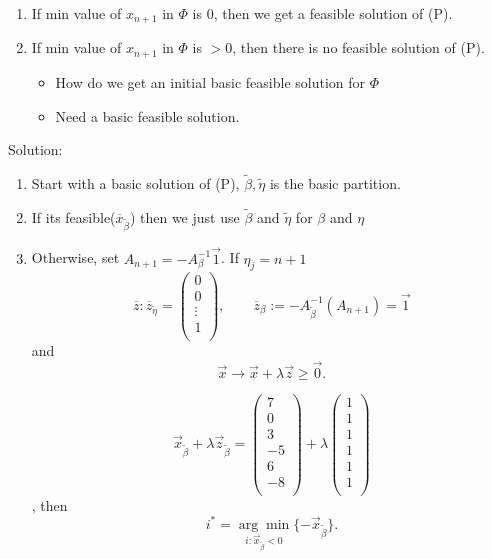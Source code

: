 \begin{enumerate}
	\item If min value of \(x_{n+1}\) in \(\Phi \) is 0, then we get a feasible solution of (P).
	\item If min value of \(x_{n+1}\) in \(\Phi \) is \(>0\), then there is no feasible solution of (P).
	      \begin{itemize}
		      \item How do we get an initial basic feasible solution for \(\Phi \)
		      \item Need a basic feasible solution.
	      \end{itemize}
\end{enumerate}

Solution:
\begin{enumerate}
	\item Start with a basic solution of (P), \(\tilde{\beta}, \tilde{\eta}\) is the basic partition.
	\item If its feasible(\(\overline{x}_{\tilde{\beta}}\)) then we just use \(\tilde{\beta}\) and \(\tilde{\eta}\) for \(\beta\) and \(\eta\)
	\item Otherwise, set \(A_{n+1} = -A^{-1}_{\beta}\vec{1}\). If \(\eta_j = n+1\)
	      \[
		      \overline{z} : \overline{z}_{\tilde{\eta}} = \begin{pmatrix}
			      0      \\
			      0      \\
			      \vdots \\
			      1      \\
		      \end{pmatrix},\qquad \overline{z}_{\beta} := -A^{-1}_{\tilde{\beta}}(A_{n+1}) = \vec{1}
	      \]
	      and\[
		      \vec{x} \to \vec{x} + \lambda \vec{z} \geq \vec{0}.
	      \] \begin{eg}
		      \[
			      \vec{x}_{\tilde{\beta}} + \lambda \vec{z}_{\tilde{\beta}} = \begin{pmatrix}
				      7  \\
				      0  \\
				      3  \\
				      -5 \\
				      6  \\
				      -8 \\
			      \end{pmatrix} + \lambda \begin{pmatrix}
				      1 \\
				      1 \\
				      1 \\
				      1 \\
				      1 \\
				      1 \\
			      \end{pmatrix}
		      \], then \[
			      i^{*} = \underset{i:\vec{x}_{\tilde{\beta}} < 0}{\arg\min}\{-\vec{x}_{\tilde{\beta}}\}.
		      \]
	      \end{eg}
\end{enumerate}

